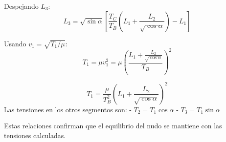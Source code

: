 \documentclass[
  11pt,
  letterpaper,
   addpoints,
   answers
  ]{exam}
\begin{document}
\begin{questions}
\begin{solution}
Despejando $L_3$:
\begin{equation}
\boxed{L_3 = \sqrt{\sin\alpha}\left[\frac{T_C}{T_B}\left(L_1 + \frac{L_2}{\sqrt{\cos\alpha}}\right) - L_1\right]}
\end{equation}


Usando $v_1 = \sqrt{T_1/\mu}$:
\begin{equation}
T_1 = \mu v_1^2 = \mu \left(\frac{L_1 + \frac{L_2}{\sqrt{\cos\alpha}}}{T_B}\right)^2
\end{equation}

\begin{equation}
\boxed{T_1 = \frac{\mu}{T_B^2}\left(L_1 + \frac{L_2}{\sqrt{\cos\alpha}}\right)^2}
\end{equation}
Las tensiones en los otros segmentos son:
- $T_2 = T_1 \cos\alpha$
- $T_3 = T_1 \sin\alpha$

Estas relaciones confirman que el equilibrio del nudo se mantiene con las tensiones calculadas.
\end{solution}
\end{questions}
\end{document}
